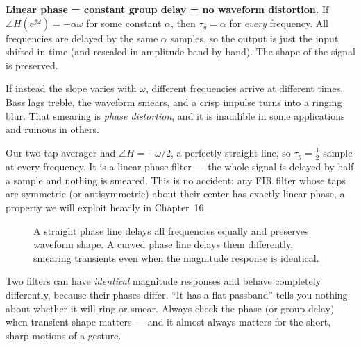 \begin{intuitionbox}
\textbf{Linear phase = constant group delay = no waveform distortion.} If
$\angle H(e^{\jj\omega}) = -\alpha\omega$ for some constant $\alpha$, then
$\tau_g = \alpha$ for \emph{every} frequency. All frequencies are delayed by the
same $\alpha$ samples, so the output is just the input shifted in time (and
rescaled in amplitude band by band). The shape of the signal is preserved.

If instead the slope varies with $\omega$, different frequencies arrive at
different times. Bass lags treble, the waveform smears, and a crisp impulse
turns into a ringing blur. That smearing is \emph{phase distortion}, and it is
inaudible in some applications and ruinous in others.
\end{intuitionbox}

Our two-tap averager had $\angle H = -\omega/2$, a perfectly straight line, so
$\tau_g = \tfrac12$ sample at every frequency. It is a linear-phase filter ---
the whole signal is delayed by half a sample and nothing is smeared. This is no
accident: any FIR filter whose taps are symmetric (or antisymmetric) about their
center has exactly linear phase, a property we will exploit heavily in
Chapter~16.

\begin{figure}[H]
\centering
{}
\caption{A straight phase line delays all frequencies equally and preserves
waveform shape. A curved phase line delays them differently, smearing transients
even when the magnitude response is identical.}
\label{ch14:fig-phase}
\end{figure}

\begin{trapbox}
Two filters can have \emph{identical} magnitude responses and behave completely
differently, because their phases differ. ``It has a flat passband'' tells you
nothing about whether it will ring or smear. Always check the phase (or group
delay) when transient shape matters --- and it almost always matters for the
short, sharp motions of a gesture.
\end{trapbox}

